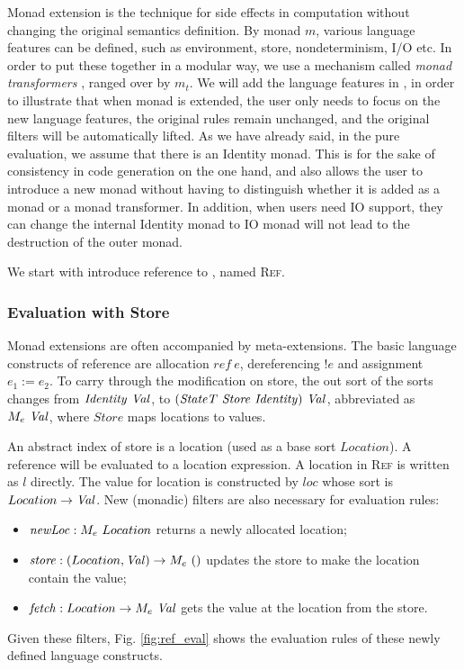 Monad extension \cite{monad-1,monad-2} is the technique for side effects in computation without changing the original semantics definition.
By monad $m$, various language features can be defined, such as environment, store, nondeterminism, I/O etc.
In order to put these together in a modular way, we use a mechanism called \textit{monad transformers} \cite{monad-tr}, ranged over by $m_t$.
We will add the language features in \STLC,
 in order to illustrate that when monad is extended,
  the user only needs to focus on the new language features,
  the original rules remain unchanged,
  and the original filters will be automatically lifted.
As we have already said,
 in the pure evaluation,
 we assume that there is an Identity monad.
This is for the sake of consistency in code generation on the one hand,
 and also allows the user to introduce a new monad without having to distinguish whether it is added as a monad or a monad transformer.
In addition, when users need IO support, they can change the internal Identity monad to IO monad will not lead to the destruction of the outer monad.

We start with introduce reference to \STLC, named \textsc{Ref}.

\subsubsection{Evaluation with Store}

Monad extensions are often accompanied by meta-extensions.
The basic language constructs of reference are allocation $ref~e$, dereferencing $!e$ and assignment $e_1:=e_2$.
To carry through the modification on store, 
 the out sort of the sorts changes from $\mathit{Identity}~\mathit{Val}$,
 to $(\mathit{StateT~Store~Identity})~\mathit{Val}$, abbreviated as $M_e~\mathit{Val}$,
 where $\mathit{Store}$ maps locations to values.

An abstract index of store is a location (used as a base sort $Location$).
A reference will be evaluated to a location expression.
A location in \textsc{Ref} is written as $l$ directly.
The value for location is constructed by $loc$ whose sort is $Location->\mathit{Val}$.
New (monadic) filters are also necessary for evaluation rules:
\begin{itemize}
  \item $\mathit{newLoc}:M_e~Location$ returns a newly allocated location;
  \item $\mathit{store}:(Location,\mathit{Val})->M_e~()$ updates the store to make the location contain the value;
  \item $\mathit{fetch}:Location->M_e~\mathit{Val}$ gets the value at the location from the store.
\end{itemize}
Given these filters, Fig. \ref{fig:ref_eval} shows the evaluation rules of these newly defined language constructs.

